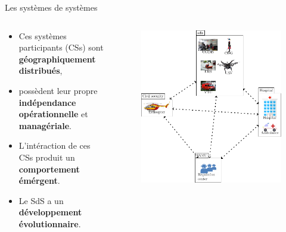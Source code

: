 

\begin{frame}{Les systèmes de systèmes}
\centering 
\begin{columns}
\begin{column}{0.4\textwidth}
\begin{block}{}
\begin{itemize}
\item  Ces systèmes participants (CSs) sont \textbf{géographiquement
distribués}, 
\item possèdent leur propre \textbf{indépendance
opérationnelle} et
\textbf{managériale}. 
\item L'intéraction de ces CSs produit un \textbf{comportement
émérgent}. 
\item Le SdS a un \textbf{développement évolutionnaire}.
\end{itemize} 
\end{block}
\end{column}
\begin{column}{0.5\textwidth}
\begin{figure}
\includegraphics[height=\textwidth]{imgs/fig_sos_overview.pdf}

\end{figure}
\end{column}
\end{columns}
\end{frame}
